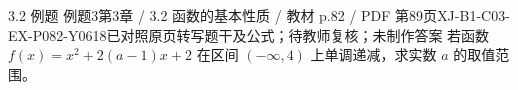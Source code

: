 \par\noindent\begin{minipage}{\linewidth}
\begin{bankitem}{3.2 例题 例题3}{第3章 / 3.2 函数的基本性质 / 教材 p.82 / PDF 第89页}{XJ-B1-C03-EX-P082-Y0618}{已对照原页转写题干及公式；待教师复核；未制作答案}
若函数 $f(x)=x^2+2(a-1)x+2$ 在区间 $(-\infty,4)$ 上单调递减，求实数 $a$ 的取值范围。
\end{bankitem}
\end{minipage}\par\medskip
